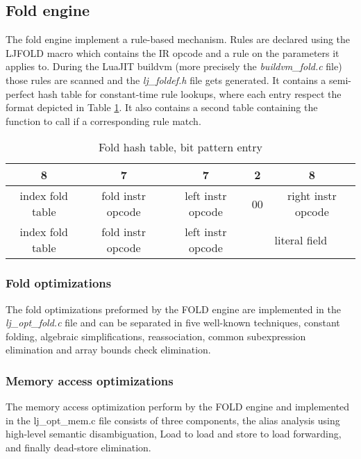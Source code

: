 
\subsection{Fold engine}
\label{Subsec:fold}

The fold engine implement a rule-based mechanism. Rules are declared using the
LJFOLD macro which contains the IR opcode and a rule on the parameters it
applies to. During the LuaJIT buildvm (more precisely the \emph{buildvm\_fold.c}
file) those rules are scanned and the \emph{lj\_foldef.h} file gets generated.
It contains a semi-perfect hash table for constant-time rule lookups, where each
entry respect the format depicted in Table \ref{tab:fold-format}. It also
contains a second table containing the function to call if a corresponding rule
match.

\begin{table}[H]
\centering
\caption{Fold hash table, bit pattern entry}
\label{tab:fold-format}
\begin{tabular}{|c|c|c|c|c|}
\hline
8                & 7                 & 7                 & 2        & 8                       \\ \hline
index fold table & fold instr opcode & left instr opcode & 00       & right instr opcode      \\ \hline
index fold table & fold instr opcode & left instr opcode & \multicolumn{2}{c|}{literal field} \\ \hline
\end{tabular}
\end{table}

\subsubsection{Fold optimizations}
\label{Subsubsec:fold}

The fold optimizations preformed by the FOLD engine are implemented in the
\emph{lj\_opt\_fold.c} file and can be separated in five well-known techniques,
constant folding, algebraic simplifications, reassociation, common subexpression
elimination and array bounds check elimination.

\subsubsection{Memory access optimizations}
\label{Subsubsec:mao}

The memory access optimization perform by the FOLD engine and implemented
in the lj\_opt\_mem.c file consists of three components, the alias
analysis using high-level semantic disambiguation, Load to load and store to load
forwarding, and finally dead-store elimination.
